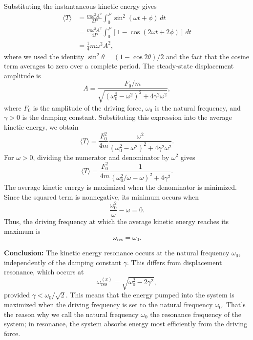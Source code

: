 \documentclass[12pt]{article}
\begin{document}
Substituting the instantaneous kinetic energy gives
\begin{align}
    \langle T\rangle
    &=\frac{m\omega^2A^2}{2P}
      \int_0^P\sin^2(\omega t+\phi)\,dt \\
    &=\frac{m\omega^2A^2}{4P}
      \int_0^P[1-\cos(2\omega t+2\phi)]\,dt \\
    &=\frac{1}{4}m\omega^2A^2,
\end{align}
where we used the identity
$\sin^2\theta=(1-\cos 2\theta)/2$ and the fact that
the cosine term averages to zero over a complete period. The steady-state displacement amplitude is
\begin{equation}
    A=\frac{F_0/m}
    {\sqrt{(\omega_0^2-\omega^2)^2+4\gamma^2\omega^2}},
\end{equation}
where $F_0$ is the amplitude of the driving force,
$\omega_0$ is the natural frequency, and $\gamma>0$
is the damping constant. Substituting this expression into the average kinetic energy,
we obtain
\begin{equation}
    \langle T\rangle
    =\frac{F_0^2}{4m}
    \frac{\omega^2}
    {(\omega_0^2-\omega^2)^2+4\gamma^2\omega^2}.
\end{equation}
For $\omega>0$, dividing the numerator and denominator
by $\omega^2$ gives
\begin{equation}
    \langle T\rangle
    =\frac{F_0^2}{4m}
    \frac{1}
    {(\omega_0^2/\omega-\omega)^2+4\gamma^2}.
\end{equation}
The average kinetic energy is maximized when the denominator is minimized. Since the squared term is nonnegative, its minimum occurs when
\begin{equation}
    \frac{\omega_0^2}{\omega}-\omega=0.
\end{equation}
Thus, the driving frequency at which the average kinetic
energy reaches its maximum is
\begin{equation}
    \boxed{\omega_{\mathrm{res}}=\omega_0.}
\end{equation}

\textbf{Conclusion:}
The kinetic energy resonance occurs at the natural frequency
$\omega_0$, independently of the damping constant $\gamma$.
This differs from displacement resonance, which occurs at
\begin{equation}
    \omega_{\mathrm{res}}^{(x)}
    =\sqrt{\omega_0^2-2\gamma^2},
\end{equation}
provided $\gamma<\omega_0/\sqrt{2}$. This means that the energy pumped into the system is maximized when the driving frequency is set to the natural frequency $\omega_0$. That's the reason why we call the natural frequency $\omega_0$ the resonance frequency of the system; in resonance, the system absorbs energy most efficiently from the driving force.
\end{document}

